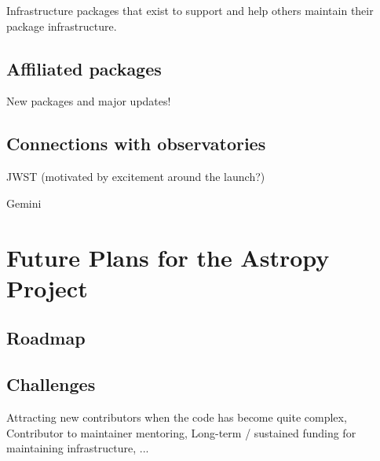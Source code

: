 \documentclass[modern]{aastex631}
\begin{document}
Infrastructure packages that exist to support and help others maintain their package infrastructure.

\subsection{Affiliated packages}

New packages and major updates!

\subsection{Connections with observatories}

JWST (motivated by excitement around the launch?)

Gemini


\section{Future Plans for the Astropy Project} \label{sec:future}

\subsection{Roadmap}

\subsection{Challenges}

Attracting new contributors when the code has become quite complex,
Contributor to maintainer mentoring,
Long-term / sustained funding for maintaining infrastructure,
...
\end{document}
